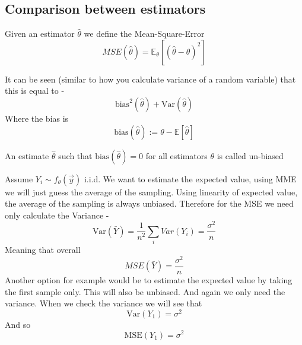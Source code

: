 \documentclass[../main.tex]{subfiles}
\begin{document}
\subsection{Comparison between estimators}
\begin{definition}
Given an estimator $\hat{\theta}$ we define the Mean-Square-Error \[MSE(\hat{\theta})=\mathbb{E}_{\theta}\left[(\hat{\theta}-\theta)^2\right]\]
\end{definition}
It can be seen (similar to how you calculate variance of a random variable) that this is equal to - 
\[\text{bias}^2(\hat{\theta})+\text{Var}(\hat{\theta})\]
Where the bias is 
\[\text{bias}(\hat{\theta}):=\theta-\mathbb{E}[\hat{\theta}]\]
\begin{definition} An estimate $\hat{\theta}$ such that $\text{bias}(\hat{\theta})=0$ for all estimators $\theta$ is called un-biased \end{definition}
\begin{example} Assume $Y_i\sim f_{\theta}(\overrightarrow{y})$ i.i.d.
We want to estimate the expected value, using MME we will just guess the average of the sampling. Using linearity of expected value, the average of the sampling is always unbiased. Therefore for the MSE we need only calculate the Variance -
\[\text{Var}(\bar{Y}) = \frac{1}{n^2}\sum_i Var(Y_i) = \frac{\sigma^2}{n}\]
Meaning that overall
\[MSE(\bar{Y}) = \frac{\sigma^2}{n}\]
Another option for example would be to estimate the expected value by taking the first sample only. This will also be unbiased. And again we only need the variance. When we check the variance we will see that
\[\text{Var}(Y_1) = \sigma^2\]
And so 
\[\text{MSE}(Y_1) = \sigma^2\]
\end{example}
\end{document}
